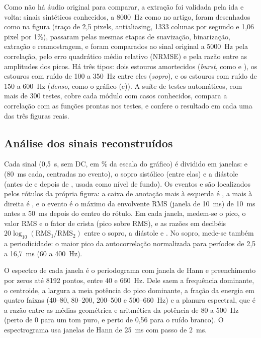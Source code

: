 Como não há áudio original para comparar, a extração foi validada pela ida e volta: sinais sintéticos conhecidos, a 8000~Hz como no artigo, foram desenhados como na figura (traço de 2,5 pixels, antialiasing, 1333 colunas por segundo e 1,06 pixel por 1\%), passaram pelas mesmas etapas de suavização, binarização, extração e reamostragem, e foram comparados ao sinal original a 5000~Hz pela correlação, pelo erro quadrático médio relativo (NRMSE) e pela razão entre as amplitudes dos picos. Há três tipos: dois estouros amortecidos (\emph{burst}, como \Sone{} e \Stwo), os estouros com ruído de 100 a 350~Hz entre eles (\emph{sopro}), e os estouros com ruído de 150 a 600~Hz (\emph{denso}, como o gráfico (c)). A suíte de testes automáticos, com mais de 300 testes, cobre cada módulo com casos conhecidos, compara a correlação com as funções prontas nos testes, e confere o resultado em cada uma das três figuras reais.

\subsection{Análise dos sinais reconstruídos}
\label{sec:metodo-analise}

Cada sinal (0,5~s, sem DC, em \% da escala do gráfico) é dividido em janelas: \Sone{} e \Stwo{} (80~ms cada, centradas no evento), o sopro sistólico (entre elas) e a diástole (antes de \Sone{} e depois de \Stwo, usada como nível de fundo). Os eventos \Sone{} e \Stwo{} são localizados pelos rótulos da própria figura: a caixa de anotação mais à esquerda é \Sone{}, a mais à direita é \Stwo, e o evento é o máximo da envolvente RMS (janela de 10~ms) de 10~ms antes a 50~ms depois do centro do rótulo. Em cada janela, medem-se o pico, o valor RMS e o fator de crista (pico sobre RMS), e as razões em decibéis $20\log_{10}(\text{RMS}_1/\text{RMS}_2)$ entre o sopro, a diástole e \Sone. No sopro, mede-se também a periodicidade: o maior pico da autocorrelação normalizada para períodos de 2,5 a 16,7~ms (60 a 400~Hz).

O espectro de cada janela é o periodograma com janela de Hann e preenchimento por zeros até 8192 pontos, entre 40 e 660~Hz. Dele saem a frequência dominante, o centroide, a largura a meia potência do pico dominante, a fração da energia em quatro faixas (40--80, 80--200, 200--500 e 500--660~Hz) e a planura espectral, que é a razão entre as médias geométrica e aritmética da potência de 80 a 500~Hz (perto de 0 para um tom puro, e perto de 0,56 para o ruído branco). O espectrograma usa janelas de Hann de 25~ms com passo de 2~ms.
